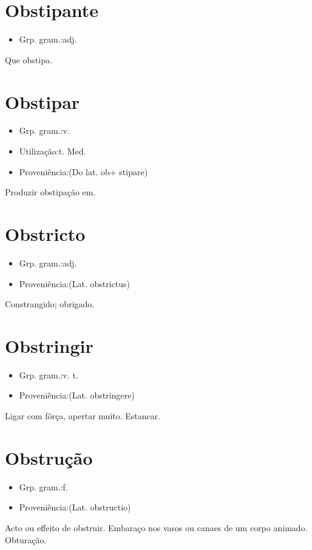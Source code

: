 \section{Obstipante}
\begin{itemize}
\item {Grp. gram.:adj.}
\end{itemize}
Que obstipa.
\section{Obstipar}
\begin{itemize}
\item {Grp. gram.:v.}
\end{itemize}
\begin{itemize}
\item {Utilização:t. Med.}
\end{itemize}
\begin{itemize}
\item {Proveniência:(Do lat. \textunderscore ob\textunderscore  + \textunderscore stipare\textunderscore )}
\end{itemize}
Produzir obstipação em.
\section{Obstricto}
\begin{itemize}
\item {Grp. gram.:adj.}
\end{itemize}
\begin{itemize}
\item {Proveniência:(Lat. \textunderscore obstrictus\textunderscore )}
\end{itemize}
Constrangido; obrigado.
\section{Obstringir}
\begin{itemize}
\item {Grp. gram.:v. t.}
\end{itemize}
\begin{itemize}
\item {Proveniência:(Lat. \textunderscore obstringere\textunderscore )}
\end{itemize}
Ligar com fôrça, apertar muito.
Estancar.
\section{Obstrução}
\begin{itemize}
\item {Grp. gram.:f.}
\end{itemize}
\begin{itemize}
\item {Proveniência:(Lat. \textunderscore obstructio\textunderscore )}
\end{itemize}
Acto ou effeito de obstruir.
Embaraço nos vasos ou canaes de um corpo animado.
Obturação.
